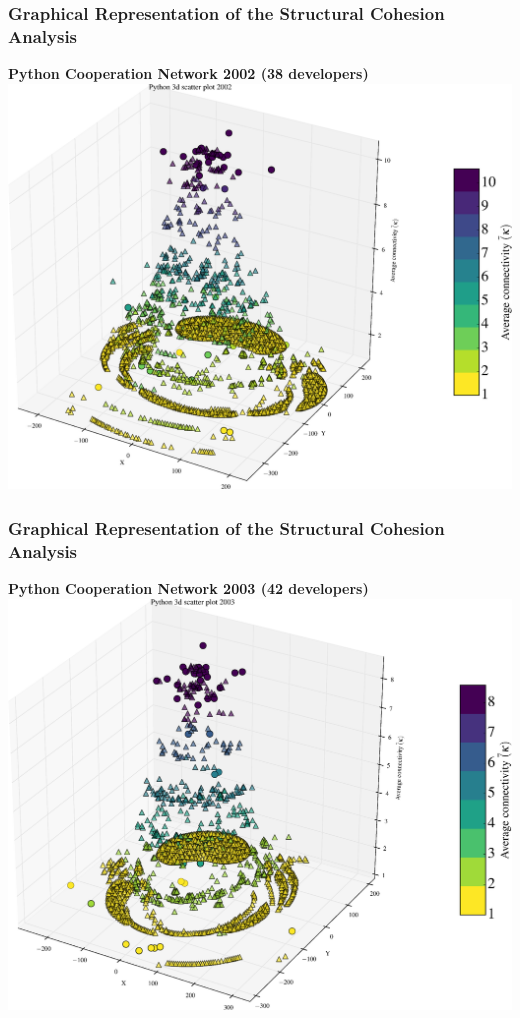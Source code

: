 \documentclass[ignorenonframetext,red,8pt,notes=hide]{beamer}
\begin{document}
\begin{frame}
\frametitle{Graphical Representation of the Structural Cohesion Analysis}

\begin{center}
\textbf{Python Cooperation Network 2002 (38 developers)}
\includegraphics[scale=0.25]{img/3d_scatter_python_2002}
\end{center}

\end{frame}

\begin{frame}
\frametitle{Graphical Representation of the Structural Cohesion Analysis}

\begin{center}
\textbf{Python Cooperation Network 2003 (42 developers)}
\includegraphics[scale=0.25]{img/3d_scatter_python_2003}
\end{center}

\end{frame}
\end{document}
